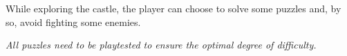 While exploring the castle, the player can choose to solve some puzzles and, by so, avoid fighting some enemies.

\textit{All puzzles need to be playtested to ensure the optimal degree of difficulty.}